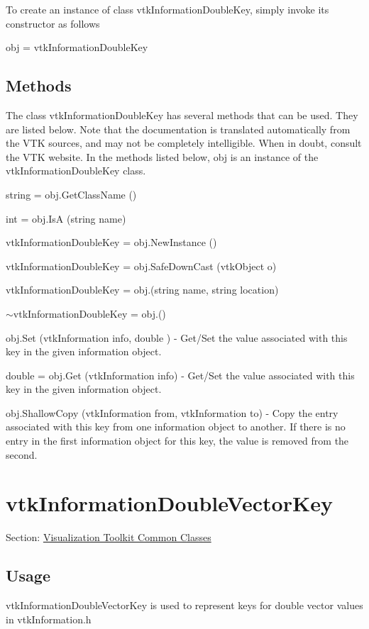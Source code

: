 To create an instance of class vtk\-Information\-Double\-Key, simply invoke its constructor as follows \begin{DoxyVerb}  obj = vtkInformationDoubleKey
\end{DoxyVerb}
 \hypertarget{vtkwidgets_vtkxyplotwidget_Methods}{}\subsection{Methods}\label{vtkwidgets_vtkxyplotwidget_Methods}
The class vtk\-Information\-Double\-Key has several methods that can be used. They are listed below. Note that the documentation is translated automatically from the V\-T\-K sources, and may not be completely intelligible. When in doubt, consult the V\-T\-K website. In the methods listed below, {\ttfamily obj} is an instance of the vtk\-Information\-Double\-Key class. 
\begin{DoxyItemize}
\item {\ttfamily string = obj.\-Get\-Class\-Name ()}  
\item {\ttfamily int = obj.\-Is\-A (string name)}  
\item {\ttfamily vtk\-Information\-Double\-Key = obj.\-New\-Instance ()}  
\item {\ttfamily vtk\-Information\-Double\-Key = obj.\-Safe\-Down\-Cast (vtk\-Object o)}  
\item {\ttfamily vtk\-Information\-Double\-Key = obj.(string name, string location)}  
\item {\ttfamily $\sim$vtk\-Information\-Double\-Key = obj.()}  
\item {\ttfamily obj.\-Set (vtk\-Information info, double )} -\/ Get/\-Set the value associated with this key in the given information object.  
\item {\ttfamily double = obj.\-Get (vtk\-Information info)} -\/ Get/\-Set the value associated with this key in the given information object.  
\item {\ttfamily obj.\-Shallow\-Copy (vtk\-Information from, vtk\-Information to)} -\/ Copy the entry associated with this key from one information object to another. If there is no entry in the first information object for this key, the value is removed from the second.  
\end{DoxyItemize}\hypertarget{vtkcommon_vtkinformationdoublevectorkey}{}\section{vtk\-Information\-Double\-Vector\-Key}\label{vtkcommon_vtkinformationdoublevectorkey}
Section\-: \hyperlink{sec_vtkcommon}{Visualization Toolkit Common Classes} \hypertarget{vtkwidgets_vtkxyplotwidget_Usage}{}\subsection{Usage}\label{vtkwidgets_vtkxyplotwidget_Usage}
vtk\-Information\-Double\-Vector\-Key is used to represent keys for double vector values in vtk\-Information.\-h

